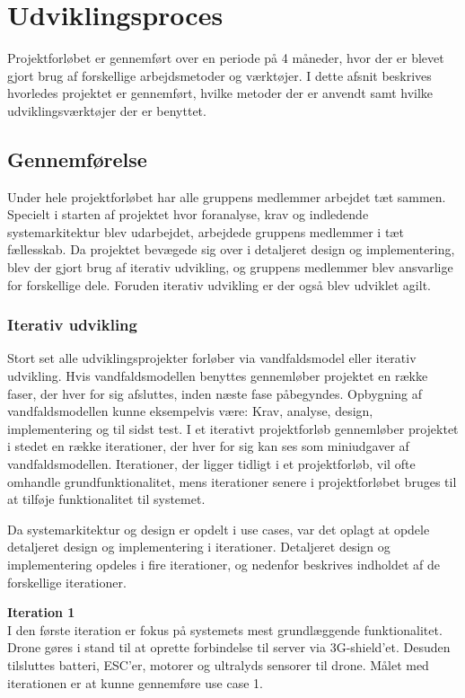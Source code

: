 \section{Udviklingsproces}
Projektforløbet er gennemført over en periode på 4 måneder, hvor der er blevet gjort brug af forskellige arbejdsmetoder og værktøjer. I dette afsnit beskrives hvorledes projektet er gennemført, hvilke metoder der er anvendt samt hvilke udviklingsværktøjer der er benyttet.

\subsection{Gennemførelse}
Under hele projektforløbet har alle gruppens medlemmer arbejdet tæt sammen. Specielt i starten af projektet hvor foranalyse, krav og indledende systemarkitektur blev udarbejdet, arbejdede gruppens medlemmer i tæt fællesskab. 
Da projektet bevægede sig over i detaljeret design og implementering, blev der gjort brug af iterativ udvikling, og gruppens medlemmer blev ansvarlige for forskellige dele. Foruden iterativ udvikling er der også blev udviklet agilt.


\subsubsection*{Iterativ udvikling}
Stort set alle udviklingsprojekter forløber via vandfaldsmodel eller iterativ udvikling. 
Hvis vandfaldsmodellen benyttes gennemløber projektet en række faser, der hver for sig afsluttes, inden næste fase påbegyndes. Opbygning af vandfaldsmodellen kunne eksempelvis være: Krav, analyse, design, implementering og til sidst test.
I et iterativt projektforløb gennemløber projektet i stedet en række iterationer, der hver for sig kan ses som miniudgaver af vandfaldsmodellen. Iterationer, der ligger tidligt i et projektforløb, vil ofte omhandle grundfunktionalitet, mens iterationer senere i projektforløbet bruges til at tilføje funktionalitet til systemet. 

\newpage 

Da systemarkitektur og design er opdelt i use cases, var det oplagt at opdele detaljeret design og implementering  i iterationer. Detaljeret design og implementering opdeles i fire iterationer, og nedenfor beskrives indholdet af de forskellige iterationer.  

\textbf{Iteration 1}\\
I den første iteration er fokus på systemets mest grundlæggende funktionalitet. 
Drone gøres i stand til at oprette forbindelse til server via 3G-shield'et.
Desuden tilsluttes batteri, ESC'er, motorer og ultralyds sensorer til drone. 
Målet med iterationen er at kunne gennemføre use case 1. 

